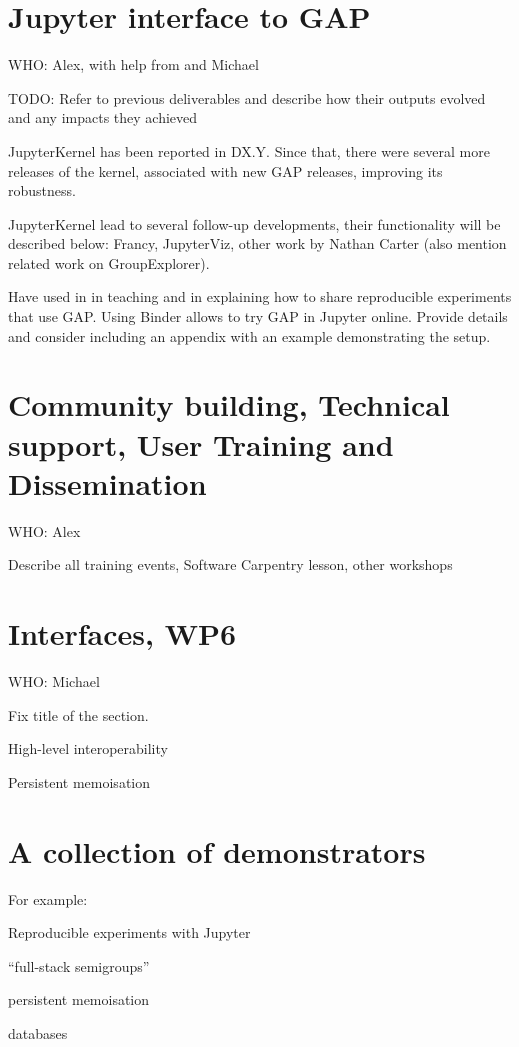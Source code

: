 \documentclass{deliverablereport}
\begin{document}
\section{Jupyter interface to GAP}

WHO: Alex, with help from and Michael

TODO: Refer to previous deliverables and describe how their outputs
evolved and any impacts they achieved

JupyterKernel has been reported in DX.Y. Since that, there were
several more releases of the kernel, associated with new GAP
releases, improving its robustness. 

JupyterKernel lead to several follow-up developments, their
functionality will be described below: Francy, JupyterViz,
other work by Nathan Carter (also mention related work on
GroupExplorer).

Have used in in teaching and in explaining how to share 
reproducible experiments that use GAP. Using Binder
allows to try GAP in Jupyter online. Provide details
and consider including an appendix with an example 
demonstrating the setup.

\section{Community building, Technical support, User Training and Dissemination}\label{gap-support}

WHO: Alex

Describe all training events, Software Carpentry lesson, other workshops

\section{Interfaces, WP6}

WHO: Michael

Fix title of the section.

High-level interoperability

Persistent memoisation

\section{A collection of demonstrators}

For example:

Reproducible experiments with Jupyter

``full-stack semigroups''

persistent memoisation

databases

\end{document}
